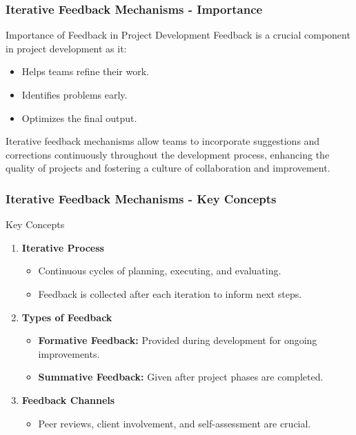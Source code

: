 \documentclass[aspectratio=169]{beamer}
\begin{document}
\begin{frame}[fragile]
    \frametitle{Iterative Feedback Mechanisms - Importance}
    \begin{block}{Importance of Feedback in Project Development}
        Feedback is a crucial component in project development as it:
        \begin{itemize}
            \item Helps teams refine their work.
            \item Identifies problems early.
            \item Optimizes the final output.
        \end{itemize}
        Iterative feedback mechanisms allow teams to incorporate suggestions and corrections continuously throughout the development process, enhancing the quality of projects and fostering a culture of collaboration and improvement.
    \end{block}
\end{frame}

\begin{frame}[fragile]
    \frametitle{Iterative Feedback Mechanisms - Key Concepts}
    \begin{block}{Key Concepts}
        \begin{enumerate}
            \item \textbf{Iterative Process}
            \begin{itemize}
                \item Continuous cycles of planning, executing, and evaluating. 
                \item Feedback is collected after each iteration to inform next steps.
            \end{itemize}
            
            \item \textbf{Types of Feedback}
            \begin{itemize}
                \item \textbf{Formative Feedback:} Provided during development for ongoing improvements.
                \item \textbf{Summative Feedback:} Given after project phases are completed.
            \end{itemize}
            
            \item \textbf{Feedback Channels}
            \begin{itemize}
                \item Peer reviews, client involvement, and self-assessment are crucial.
            \end{itemize}
        \end{enumerate}
    \end{block}
\end{frame}
\end{document}
